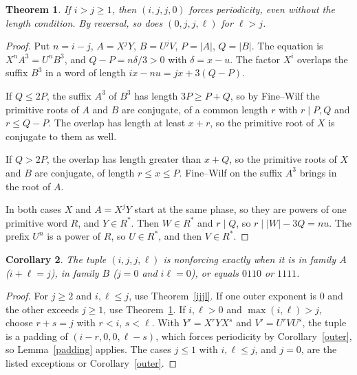 \documentclass[11pt]{article}
\newtheorem{theorem}{Theorem}
\newtheorem{corollary}[theorem]{Corollary}
\theoremstyle{remark}\newtheorem*{remark}{Remark}
\begin{document}
\begin{theorem}\label{ijj0}
If \(i>j\ge1\), then \((i,j,j,0)\) forces periodicity, even without the length condition. By reversal, so does \((0,j,j,\ell)\) for \(\ell>j\).
\end{theorem}
\begin{proof}
Put \(n=i-j\), \(A=X^jY\), \(B=U^jV\), \(P=|A|\), \(Q=|B|\). The equation is \(X^nA^3=U^nB^3\), and \(Q-P=n\delta/3>0\) with \(\delta=x-u\). The factor \(X^i\) overlaps the suffix \(B^3\) in a word of length \(ix-nu=jx+3(Q-P)\).

If \(Q\le2P\), the suffix \(A^3\) of \(B^3\) has length \(3P\ge P+Q\), so by Fine--Wilf the primitive roots of \(A\) and \(B\) are conjugate, of a common length \(r\) with \(r\mid P,Q\) and \(r\le Q-P\). The overlap has length at least \(x+r\), so the primitive root of \(X\) is conjugate to them as well.

If \(Q>2P\), the overlap has length greater than \(x+Q\), so the primitive roots of \(X\) and \(B\) are conjugate, of length \(r\le x\le P\). Fine--Wilf on the suffix \(A^3\) brings in the root of \(A\).

In both cases \(X\) and \(A=X^jY\) start at the same phase, so they are powers of one primitive word \(R\), and \(Y\in R^*\). Then \(W\in R^*\) and \(r\mid Q\), so \(r\mid |W|-3Q=nu\). The prefix \(U^n\) is a power of \(R\), so \(U\in R^*\), and then \(V\in R^*\).
\end{proof}

\begin{corollary}\label{ijjlfull}
The tuple \((i,j,j,\ell)\) is nonforcing exactly when it is in family \(A\) (\(i+\ell=j\)), in family \(B\) (\(j=0\) and \(i\ell=0\)), or equals \(0110\) or \(1111\).
\end{corollary}
\begin{proof}
For \(j\ge2\) and \(i,\ell\le j\), use Theorem~\ref{ijjl}. If one outer exponent is \(0\) and the other exceeds \(j\ge1\), use Theorem~\ref{ijj0}. If \(i,\ell>0\) and \(\max(i,\ell)>j\), choose \(r+s=j\) with \(r<i\), \(s<\ell\). With \(Y'=X^rYX^s\) and \(V'=U^rVU^s\), the tuple is a padding of \((i-r,0,0,\ell-s)\), which forces periodicity by Corollary~\ref{outer}, so Lemma~\ref{padding} applies. The cases \(j\le1\) with \(i,\ell\le j\), and \(j=0\), are the listed exceptions or Corollary~\ref{outer}.
\end{proof}
\end{document}

